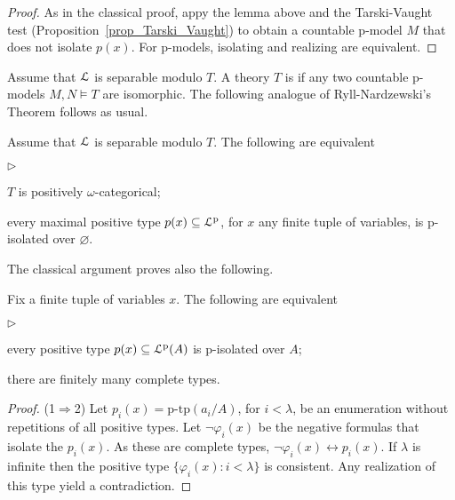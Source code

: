 \documentclass[10pt,oneside]{amsproc}
\newcommand{\mylabel}[1]{{#1}\hfill}
\renewenvironment{itemize}
  {\begin{list}{$\triangleright$}{%
  \setlength{\parskip}{0mm}
  \setlength{\topsep}{.4\baselineskip}
  \setlength{\rightmargin}{0mm}
  \setlength{\listparindent}{0mm}
  \setlength{\itemindent}{0mm}
  \setlength{\labelwidth}{3ex}
  \setlength{\itemsep}{.2\baselineskip}
  \setlength{\parsep}{.2\baselineskip}
  \setlength{\partopsep}{0mm}
  \setlength{\labelsep}{1ex}
  \setlength{\leftmargin}{\labelwidth+\labelsep}
  \let\makelabel\mylabel}}{%
\end{list}}
\renewcommand*{\emph}[1]{%
   \smash{\tikz[baseline]\node[rectangle, fill=teal!25, rounded corners, inner xsep=0.5ex, inner ysep=0.2ex, anchor=base, minimum height = 2.7ex]{\strut #1};}}
\begin{document}
{\begin{proof}
  As in the classical proof, appy the lemma above and the Tarski-Vaught test (Proposition~\ref{prop_Tarski_Vaught}) to obtain a countable p-model $M$ that does not isolate $p(x)$.
  For p-models, isolating and realizing are equivalent.
\end{proof}

Assume that ${\EuScript L}$ is separable modulo $T$.
A theory $T$ is \emph{positively $\omega$-categorical\/} if any two countable p-models $M,N\models T$ are isomorphic.
The following analogue of Ryll-Nardzewski's Theorem follows as usual.

\begin{theorem}
  Assume that ${\EuScript L}$ is separable modulo $T$.
  The following are equivalent
  \begin{itemize}
    \item[1.] $T$ is positively $\omega$-categorical;
    \item[2.] every maximal positive type $p(x)\subseteq{\EuScript L}^{\rm p}$, for $x$ any finite tuple of variables, is p-isolated over $\varnothing$.
  \end{itemize}
\end{theorem}

The classical argument proves also the following.

\begin{proposition}
  Fix a finite tuple of variables $x$.
  The following are equivalent
  \begin{itemize}
    \item[1.] every positive type $p(x)\subseteq{\EuScript L}^{\rm p}(A)$ is p-isolated over $A$;
    \item[2.] there are finitely many complete types.
  \end{itemize}
\end{proposition}

\begin{proof}
  (1$\Rightarrow$2) 
  Let $p_i(x)=\mbox{p-tp}(a_i/A)$, for $i<\lambda$, be an enumeration without repetitions of all positive types.
  Let $\neg\varphi_i(x)$ be the negative formulas that isolate the $p_i(x)$.
  As these are complete types, $\neg\varphi_i(x)\leftrightarrow p_i(x)$.
  If $\lambda$ is infinite then the positive type $\{\varphi_i(x):i<\lambda\}$ is consistent.
  Any realization of this type yield a contradiction.


\end{proof}}
\end{document}
